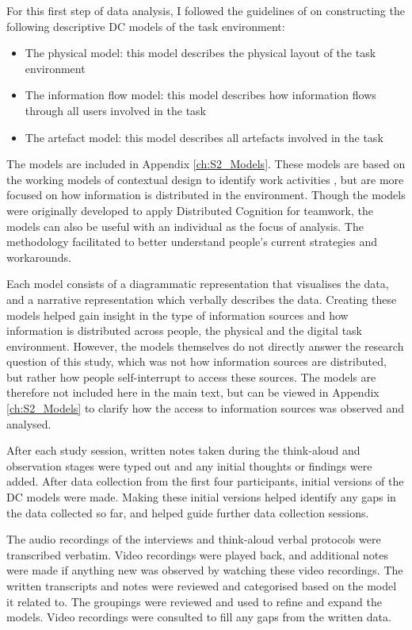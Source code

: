 For this first step of data analysis, I followed the guidelines of \citet{Furniss2006} on constructing the following descriptive DC models of the task environment:

\begin{itemize}
\item 
The physical model: this model describes the physical layout of the task environment
\item 
The information flow model: this model describes how information flows through all users involved in the task
\item 
The artefact model: this model describes all artefacts involved in the task
\end{itemize}

The models are included in Appendix \ref{ch:S2_Models}. These models are based on the working models of contextual design to identify work activities \citep{Holtzblatt2014}, but are more focused on how information is distributed in the environment. Though the models were originally developed to apply Distributed Cognition for teamwork, the models can also be useful with an individual as the focus of analysis. The methodology facilitated to better understand people’s current strategies and workarounds.

Each model consists of a diagrammatic representation that visualises the data, and a narrative representation which verbally describes the data. Creating these models helped gain insight in the type of information sources and how information is distributed across people, the physical and the digital task environment. However, the models themselves do not directly answer the research question of this study, which was not how information sources are distributed, but rather how people self-interrupt to access these sources. The models are therefore not included here in the main text, but can be viewed in Appendix \ref{ch:S2_Models} to clarify how the access to information sources was observed and analysed.

After each study session, written notes taken during the think-aloud and observation stages were typed out and any initial thoughts or findings were added. After data collection from the first four participants, initial versions of the DC models were made. Making these initial versions helped identify any gaps in the data collected so far, and helped guide further data collection sessions. 

The audio recordings of the interviews and think-aloud verbal protocols were transcribed verbatim. Video recordings were played back, and additional notes were made if anything new was observed by watching these video recordings. The written transcripts and notes were reviewed and categorised based on the model it related to. The groupings were reviewed and used to refine and expand the models. Video recordings were consulted to fill any gaps from the written data.

